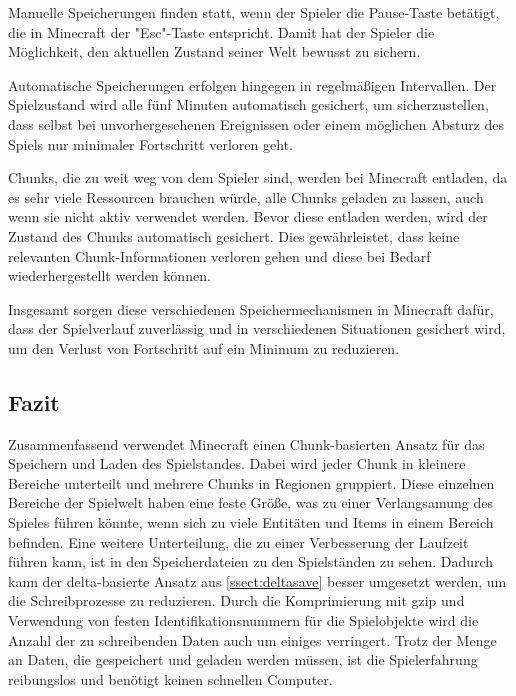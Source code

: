 Manuelle Speicherungen finden statt, wenn der Spieler die Pause-Taste betätigt, die in Minecraft der "Esc"-Taste entspricht. Damit hat der Spieler die Möglichkeit, den aktuellen Zustand seiner Welt bewusst zu sichern.\cite{minecraftSpielstandSpeicherung} 

Automatische Speicherungen erfolgen hingegen in regelmäßigen Intervallen. Der Spielzustand wird alle fünf Minuten automatisch gesichert, um sicherzustellen, dass selbst bei unvorhergesehenen Ereignissen oder einem möglichen Absturz des Spiels nur minimaler Fortschritt verloren geht.\cite{minecraftSpielstandSpeicherung}

Chunks, die zu weit weg von dem Spieler sind, werden bei Minecraft entladen, da es sehr viele Ressourcen brauchen würde, alle Chunks geladen zu lassen, auch wenn sie nicht aktiv verwendet werden. Bevor diese entladen werden, wird der Zustand des Chunks automatisch gesichert. Dies gewährleistet, dass keine relevanten Chunk-Informationen verloren gehen und diese bei Bedarf wiederhergestellt werden können.\cite{minecraftSpielstandSpeicherung}

Insgesamt sorgen diese verschiedenen Speichermechanismen in Minecraft dafür, dass der Spielverlauf zuverlässig und in verschiedenen Situationen gesichert wird, um den Verlust von Fortschritt auf ein Minimum zu reduzieren.




\subsection{Fazit}
Zusammenfassend verwendet Minecraft einen Chunk-basierten Ansatz für das Speichern und Laden des Spielstandes. Dabei wird jeder Chunk in kleinere Bereiche unterteilt und mehrere Chunks in Regionen gruppiert. Diese einzelnen Bereiche der Spielwelt haben eine feste Größe, was zu einer Verlangsamung des Spieles führen könnte, wenn sich zu viele Entitäten und Items in einem Bereich befinden. Eine weitere Unterteilung, die zu einer Verbesserung der Laufzeit führen kann, ist in den Speicherdateien zu den Spielständen zu sehen. Dadurch kann der delta-basierte Ansatz aus \ref{ssect:deltasave} besser umgesetzt werden, um die Schreibprozesse zu reduzieren. Durch die Komprimierung mit \ac{gzip} und Verwendung von festen Identifikationsnummern für die Spielobjekte wird die Anzahl der zu schreibenden Daten auch um einiges verringert. Trotz der Menge an Daten, die gespeichert und geladen werden müssen, ist die Spielerfahrung reibungslos und benötigt keinen schnellen Computer.\cite{minecraftHardware}



